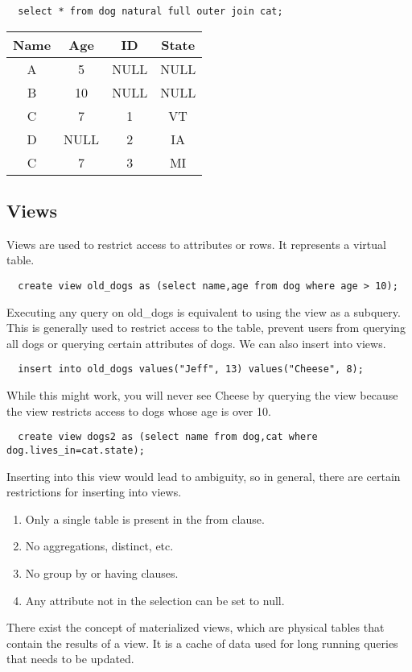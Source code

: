 \documentclass{math}
\begin{document}
\begin{lstlisting}
  select * from dog natural full outer join cat;
\end{lstlisting}
\begin{center}
  \begin{tabular}{|c|c|c|c|}
    \hline
    Name & Age & ID & State \\
    \hline
    A & 5 & NULL & NULL \\
    B & 10 & NULL & NULL \\
    C & 7 & 1 & VT \\
    D & NULL & 2 & IA \\
    C & 7 & 3 & MI \\
    \hline
  \end{tabular}
\end{center}

\subsection*{Views}
Views are used to restrict access to attributes or rows. It represents a virtual
table.
\begin{lstlisting}
  create view old_dogs as (select name,age from dog where age > 10);
\end{lstlisting}
Executing any query on old\_dogs is equivalent to using the view as a subquery.
This is generally used to restrict access to the table, prevent users from
querying all dogs or querying certain attributes of dogs. We can also insert
into views.
\begin{lstlisting}
  insert into old_dogs values("Jeff", 13) values("Cheese", 8);
\end{lstlisting}
While this might work, you will never see Cheese by querying the view because
the view restricts access to dogs whose age is over 10.
\begin{lstlisting}
  create view dogs2 as (select name from dog,cat where dog.lives_in=cat.state);
\end{lstlisting}
Inserting into this view would lead to ambiguity, so in general, there are
certain restrictions for inserting into views.
\begin{enumerate}
  \item Only a single table is present in the from clause.
  \item No aggregations, distinct, etc.
  \item No group by or having clauses.
  \item Any attribute not in the selection can be set to null.
\end{enumerate}
There exist the concept of materialized views, which are physical tables that
contain the results of a view. It is a cache of data used for long running
queries that needs to be updated.
\end{document}
